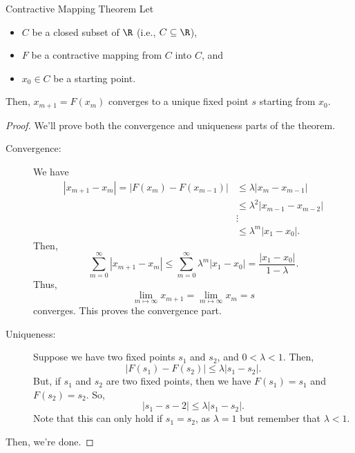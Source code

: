 \documentclass[letterpaper]{article}
\begin{document}
\begin{theorem}{Contractive Mapping Theorem}{}
    Let 
    \begin{itemize}
        \item $C$ be a closed subset of $\R$ (i.e., $C \subseteq \R$),
        \item $F$ be a contractive mapping from $C$ into $C$, and 
        \item $x_0 \in C$ be a starting point. 
    \end{itemize}
    Then, $x_{m + 1} = F(x_m)$ converges to a unique fixed point $s$ starting from $x_0$.
\end{theorem}
\begin{proof}
    We'll prove both the convergence and uniqueness parts of the theorem.
    \begin{description}
        \item[Convergence:] We have 
        \[\begin{aligned}
            |x_{m + 1} - x_m| = |F(x_m) - F(x_{m - 1})| &\leq \lambda |x_m - x_{m - 1}| \\ 
                &\leq \lambda^2 |x_{m - 1} - x_{m - 2}| \\ 
                &\vdots \\ 
                &\leq \lambda^m |x_1 - x_0|.
        \end{aligned}\]
        Then, \[\sum_{m = 0}^{\infty} |x_{m + 1} - x_m| \leq \sum_{m = 0}^{\infty} \lambda^m |x_1 - x_0| = \frac{|x_1 - x_0|}{1 - \lambda}.\]
        Thus, \[\lim_{m \mapsto \infty} x_{m + 1} = \lim_{m \mapsto \infty} x_m = s\] converges. This proves the convergence part. 

        \item[Uniqueness:] Suppose we have two fixed points $s_1$ and $s_2$, and $0 < \lambda < 1$. Then, \[|F(s_1) - F(s_2)| \leq \lambda |s_1 - s_2|.\]
        But, if $s_1$ and $s_2$ are two fixed points, then we have $F(s_1) = s_1$ and $F(s_2) = s_2$. So, 
        \[|s_1 - s-2| \leq \lambda |s_1 - s_2|.\]
        Note that this can only hold if $s_1 = s_2$, as $\lambda = 1$ but remember that $\lambda < 1$. 
    \end{description}
    Then, we're done. 
\end{proof}
\end{document}
